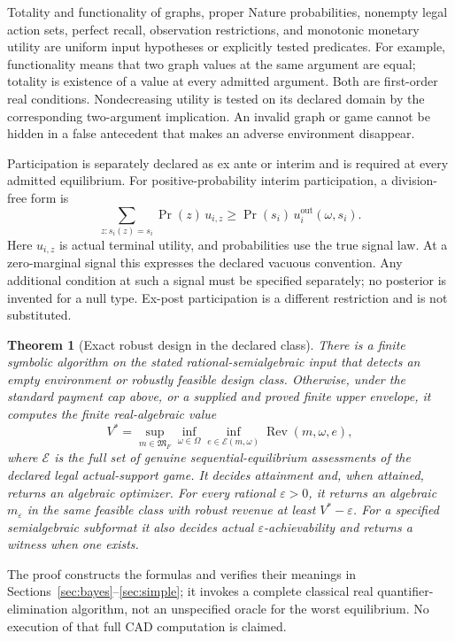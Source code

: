 \documentclass[11pt,a4paper]{article}
\numberwithin{equation}{section}
\newtheorem{theorem}{Theorem}
\theoremstyle{definition}
\newcommand{\cE}{\mathcal E}
\DeclareMathOperator{\Rev}{Rev}
\begin{document}
Totality and functionality of graphs, proper Nature probabilities,
nonempty legal action sets, perfect recall, observation restrictions,
and monotonic monetary utility are uniform input hypotheses or
explicitly tested predicates.
For example, functionality means that two graph values at the same
argument are equal; totality is existence of a value at every admitted
argument. Both are first-order real conditions.
Nondecreasing utility is tested on its declared domain by the
corresponding two-argument implication.
An invalid graph or game cannot be hidden in a false antecedent that
makes an adverse environment disappear.

Participation is separately declared as ex ante or interim and is
required at every admitted equilibrium.
For positive-probability interim participation, a division-free form is
\begin{equation}\label{eq:interimIR}
 \sum_{z:s_i(z)=s_i}\Pr(z)\,u_{i,z}
 \ge \Pr(s_i)\,u_i^{\mathrm{out}}(\omega,s_i).
\end{equation}
Here \(u_{i,z}\) is actual terminal utility, and probabilities use the
true signal law. At a zero-marginal signal this expresses the declared
vacuous convention. Any additional condition at such a signal must
be specified separately; no posterior is invented for a null type.
Ex-post participation is a different restriction and is not substituted.

\begin{theorem}[Exact robust design in the declared class]\label{thm:main}
There is a finite symbolic algorithm on the stated rational-semialgebraic
input that detects an empty environment or robustly feasible design
class. Otherwise, under the standard payment cap above, or a supplied
and proved finite upper envelope, it computes the finite real-algebraic
value
\[
 V^*=\sup_{m\in\mathfrak M_F}\inf_{\omega\in\Omega}
          \inf_{e\in\cE(m,\omega)}\Rev(m,\omega,e),
\]
where \(\cE\) is the full set of genuine sequential-equilibrium
assessments of the declared legal actual-support game.
It decides attainment and, when attained, returns an algebraic
optimizer. For every rational \(\varepsilon>0\), it returns an
algebraic \(m_\varepsilon\) in the same feasible class with robust
revenue at least \(V^*-\varepsilon\).
For a specified semialgebraic subformat it also decides actual
\(\varepsilon\)-achievability and returns a witness when one exists.
\end{theorem}
The proof constructs the formulas and verifies their meanings in
Sections~\ref{sec:bayes}--\ref{sec:simple}; it invokes a complete
classical real quantifier-elimination algorithm, not an unspecified
oracle for the worst equilibrium.
No execution of that full CAD computation is claimed.
\end{document}
